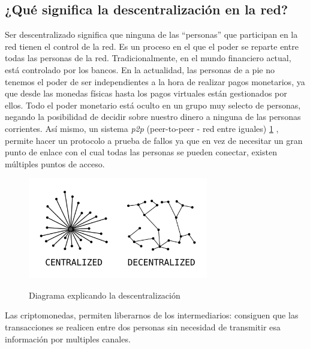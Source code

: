 \subsection{¿Qué significa la descentralización en la red?}
Ser descentralizado significa que ninguna de las “personas” que participan en la red tienen el control de la red. Es un proceso en el que el poder se reparte entre todas las personas de la red. Tradicionalmente, en el mundo financiero actual, está controlado por los bancos. En la actualidad, las personas de a pie no tenemos el poder de ser independientes a la hora de realizar pagos monetarios, ya que desde las monedas físicas hasta los pagos virtuales están gestionados por ellos. Todo el poder monetario está oculto en un grupo muy selecto de personas, negando la posibilidad de decidir sobre nuestro dinero a ninguna de las personas corrientes.
Así mismo, un sistema \textit{p2p} (peer-to-peer - red entre iguales) \ref{fg:decentralization_diagram} \cite{web:p2p}, permite hacer un protocolo a prueba de fallos ya que en vez de necesitar un gran punto de enlace con el cual todas las personas se pueden conectar, existen múltiples puntos de acceso.
\begin{figure}[H]
    \centering
    \includegraphics[width=0.7\textwidth]{Figures/Decentralization_diagram.png}
    \caption{Diagrama explicando la descentralización}
    \label{fg:decentralization_diagram}
    \cite{web:decentralization}
\end{figure}
Las criptomonedas, permiten liberarnos de los intermediarios: consiguen que las transacciones se realicen entre dos personas sin necesidad de transmitir esa información por multiples canales.
